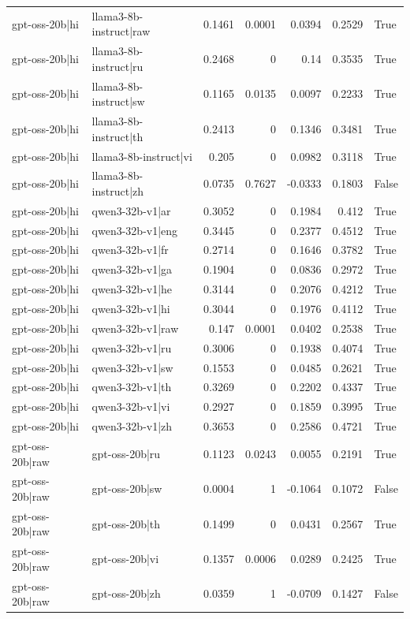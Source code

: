 \begin{table}
\begin{tabular}{l l r r r r l}
gpt-oss-20b|hi & llama3-8b-instruct|raw & 0.1461 & 0.0001 & 0.0394 & 0.2529 & True \\
gpt-oss-20b|hi & llama3-8b-instruct|ru & 0.2468 & 0 & 0.14 & 0.3535 & True \\
gpt-oss-20b|hi & llama3-8b-instruct|sw & 0.1165 & 0.0135 & 0.0097 & 0.2233 & True \\
gpt-oss-20b|hi & llama3-8b-instruct|th & 0.2413 & 0 & 0.1346 & 0.3481 & True \\
gpt-oss-20b|hi & llama3-8b-instruct|vi & 0.205 & 0 & 0.0982 & 0.3118 & True \\
gpt-oss-20b|hi & llama3-8b-instruct|zh & 0.0735 & 0.7627 & -0.0333 & 0.1803 & False \\
gpt-oss-20b|hi & qwen3-32b-v1|ar & 0.3052 & 0 & 0.1984 & 0.412 & True \\
gpt-oss-20b|hi & qwen3-32b-v1|eng & 0.3445 & 0 & 0.2377 & 0.4512 & True \\
gpt-oss-20b|hi & qwen3-32b-v1|fr & 0.2714 & 0 & 0.1646 & 0.3782 & True \\
gpt-oss-20b|hi & qwen3-32b-v1|ga & 0.1904 & 0 & 0.0836 & 0.2972 & True \\
gpt-oss-20b|hi & qwen3-32b-v1|he & 0.3144 & 0 & 0.2076 & 0.4212 & True \\
gpt-oss-20b|hi & qwen3-32b-v1|hi & 0.3044 & 0 & 0.1976 & 0.4112 & True \\
gpt-oss-20b|hi & qwen3-32b-v1|raw & 0.147 & 0.0001 & 0.0402 & 0.2538 & True \\
gpt-oss-20b|hi & qwen3-32b-v1|ru & 0.3006 & 0 & 0.1938 & 0.4074 & True \\
gpt-oss-20b|hi & qwen3-32b-v1|sw & 0.1553 & 0 & 0.0485 & 0.2621 & True \\
gpt-oss-20b|hi & qwen3-32b-v1|th & 0.3269 & 0 & 0.2202 & 0.4337 & True \\
gpt-oss-20b|hi & qwen3-32b-v1|vi & 0.2927 & 0 & 0.1859 & 0.3995 & True \\
gpt-oss-20b|hi & qwen3-32b-v1|zh & 0.3653 & 0 & 0.2586 & 0.4721 & True \\
gpt-oss-20b|raw & gpt-oss-20b|ru & 0.1123 & 0.0243 & 0.0055 & 0.2191 & True \\
gpt-oss-20b|raw & gpt-oss-20b|sw & 0.0004 & 1 & -0.1064 & 0.1072 & False \\
gpt-oss-20b|raw & gpt-oss-20b|th & 0.1499 & 0 & 0.0431 & 0.2567 & True \\
gpt-oss-20b|raw & gpt-oss-20b|vi & 0.1357 & 0.0006 & 0.0289 & 0.2425 & True \\
gpt-oss-20b|raw & gpt-oss-20b|zh & 0.0359 & 1 & -0.0709 & 0.1427 & False \\

\end{tabular}
\end{table}
